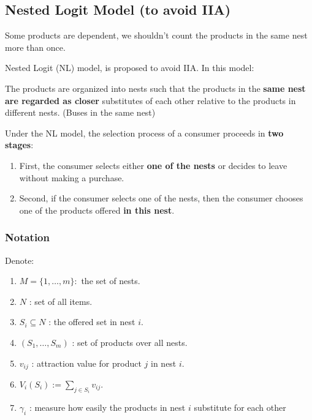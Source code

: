 \documentclass[11pt]{elegantbook}
\begin{document}
\subsection{Nested Logit Model (to avoid IIA)}
Some products are dependent, we shouldn't count the products in the same nest more than once.

Nested Logit (NL) model, is proposed to avoid IIA. In this model:

The products are organized into nests such that the products in the \textbf{same nest are regarded as closer} substitutes of each other relative to the products in different nests. (Buses in the same nest)

Under the NL model, the selection process of a consumer proceeds in \textbf{two stages}:
\begin{enumerate}[$\bullet$]
    \item First, the consumer selects either \textbf{one of the nests} or decides to leave without making a purchase.
    \item Second, if the consumer selects one of the nests, then the consumer chooses one of the products offered \textbf{in this nest}.
\end{enumerate}
\subsubsection{Notation}
Denote:
\begin{enumerate}[$\bullet$]
    \item $M=\{1, \ldots, m\}:$ the set of nests.
    \item $N$ : set of all items.
    \item $S_{i} \subseteq N$ : the offered set in nest $i$.
    \item $\left(S_{1}, \ldots, S_{m}\right)$ : set of products over all nests.
    \item $v_{i j}$ : attraction value for product $j$ in nest $i$.
    \item $V_{i}\left(S_{i}\right):=\sum_{j \in S_{i}} v_{i j}$.
    \item $\gamma_{i}$ : measure how easily the products in nest $i$ substitute for each other
\end{enumerate}
\end{document}
